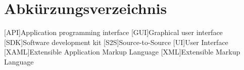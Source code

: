 \chapter{Abkürzungsverzeichnis}
\begin{acronym}[XAML]
[API]{Application programming interface}
[GUI]{Graphical user interface}
[SDK]{Software development kit}
[S2S]{Source-to-Source}
[UI]{User Interface}
[XAML]{Extensible Application Markup Language}
[XML]{Extensible Markup Language}
\end{acronym}